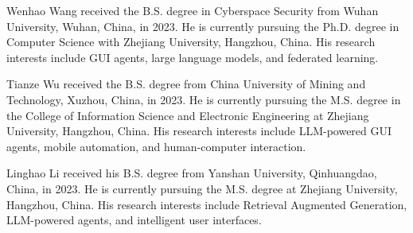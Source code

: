 \vspace{-3em}

\begin{IEEEbiography}{Wenhao Wang}
received the B.S. degree in Cyberspace Security from Wuhan University, Wuhan, China, in 2023. He is currently pursuing the Ph.D. degree in Computer Science with Zhejiang University, Hangzhou, China. His research interests include GUI agents, large language models, and federated learning.
\end{IEEEbiography}

\vspace{-3em}

\begin{IEEEbiography}{Tianze Wu}
received the B.S. degree from China University of Mining and Technology, Xuzhou, China, in 2023. He is currently pursuing the M.S. degree in the College of Information Science and Electronic Engineering at Zhejiang University, Hangzhou, China. His research interests include LLM-powered GUI agents, mobile automation, and human-computer interaction.
\end{IEEEbiography}

\vspace{-3em}

\begin{IEEEbiography}{Linghao Li}
received his B.S. degree from Yanshan University, Qinhuangdao, China, in 2023. He is currently pursuing the M.S. degree at Zhejiang University, Hangzhou, China. His research interests include Retrieval Augmented Generation, LLM-powered agents, and intelligent user interfaces.
\end{IEEEbiography}

